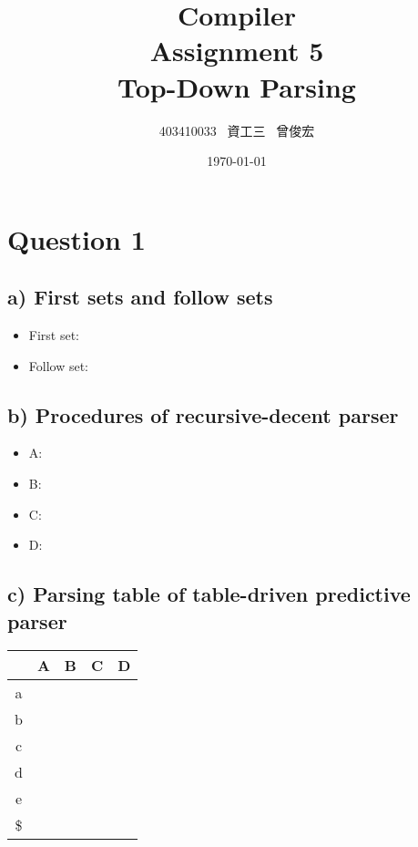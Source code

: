 \documentclass[12pt, A4]{article}
\title{Compiler \\ Assignment 5 \\ Top-Down Parsing}
\author{403410033 \ 資工三 \ 曾俊宏}
\date{\today}
\begin{document}
	
	\maketitle
	\newpage

	\section{Question 1}
	
	\subsection*{a) First sets and follow sets}
	
	\begin{itemize}
		\item First set: 
		\item Follow set:
	\end{itemize}
	
	\subsection*{b) Procedures of recursive-decent parser}
	
	\begin{itemize}
		\item A: 
		\item B:
		\item C:
		\item D:
	\end{itemize}
	
	\subsection*{c) Parsing table of table-driven predictive parser}
	
	\begin{tabular}{|c|c|c|c|c|}
		\hline 
		   & A & B & C & D \\ 
		\hline 
		a  &  &  &  &  \\ 
		\hline 
		b  &  &  &  &  \\ 
		\hline 
		c  &  &  &  &  \\ 
		\hline 
		d  &  &  &  &  \\ 
		\hline 
		e  &  &  &  &  \\ 
		\hline 
		\$ &  &  &  &  \\ 
		\hline 
	\end{tabular} 
	
\end{document}
